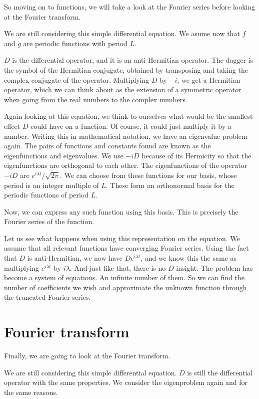 \documentclass{article}
\newcounter{problem}[section]\setcounter{problem}{1}
\begin{document}
So moving on to functions, we will take a look at the Fourier series before looking at the Fourier transform.

We are still considering this simple differential equation.
We asume now that $f$ and $g$ are periodic functions with period $L$.

$D$ is the differential operator, and it is an anti-Hermitian operator.
The dagger is the symbol of the Hermitian conjugate, obtained by transposing and taking the complex conjugate of the operator.
Multiplying $D$ by $-i$, we get a Hermitian operator, which we can think about as the extension of a symmetric operator when going from the real numbers to the complex numbers.

Again looking at this equation, we think to ourselves what would be the smallest effect $D$ could have on a function.
Of course, it could just multiply it by a number.
Writing this in mathematical notation, we have an eigenvalue problem again. The pairs of functions and constants found are known as the eigenfunctions and eigenvalues.
We use $-iD$ because of its Hermicity so that the eigenfunctions are orthogonal to each other.
The eigenfunctions of the operator $-iD$ are $e^{i\lambda t}/\sqrt{2\pi}$.
We can choose from these functions for our basis, whose period is an integer multiple of $L$.
These form an orthonormal basis for the periodic functions of period $L$.

Now, we can express any such function using this basis.
This is precisely the Fourier series of the function.

Let us see what happens when using this representation on the equation.
We assume that all relevant functions have converging Fourier series.
Using the fact that $D$ is anti-Hermitian, we now have $D e^{i\lambda t}$, and we know this the same as multiplying $e^{i\lambda t}$ by $i\lambda$.
And just like that, there is no $D$ insight. The problem has become a system of equations.
An infinite number of them.
So we can find the number of coefficients we wish and approximate the unknown function through the truncated Fourier series.

\section{Fourier transform}

Finally, we are going to look at the Fourier transform.

We are still considering this simple differential equation.
$D$ is still the differential operator with the same properties.
We consider the eigenproblem again and for the same reasons.
\end{document}
